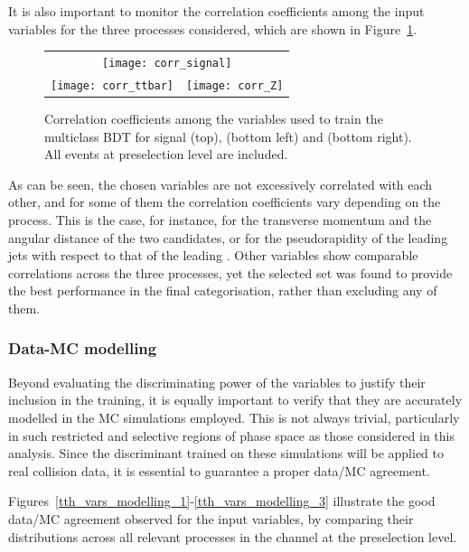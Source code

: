   It is also important to monitor the correlation coefficients among the input variables for the three processes considered, which are shown in Figure~\ref{tth_vars_corr}.
  \begin{figure}[htbp]
    \centering
    \setlength{\tabcolsep}{2pt}
    \renewcommand{\arraystretch}{0}
  
    \begin{tabular}{@{}c c@{}}
      \multicolumn{2}{c}{\texttt{[image: corr\_signal]}} \\[6pt]
      \texttt{[image: corr\_ttbar]} &
      \texttt{[image: corr\_Z]}
    \end{tabular}
  
    \caption{Correlation coefficients among the variables used to train the multiclass BDT for signal (top), \ttbar (bottom left) and \ztautau (bottom right). All events at preselection level are included.}
    \label{tth_vars_corr}
  \end{figure}
  
  As can be seen, the chosen variables are not excessively correlated with each other, and for some of them the correlation coefficients vary depending on the process. This is the case, for instance, for the transverse momentum and the angular distance of the two \tauhad candidates, or for the pseudorapidity of the leading jets with respect to that of the leading \tauhad. Other variables show comparable correlations across the three processes, yet the selected set was found to provide the best performance in the final categorisation, rather than excluding any of them.
  

\subsubsection*{Data-MC modelling}

Beyond evaluating the discriminating power of the variables to justify their inclusion in the training, it is equally important to verify that they are accurately modelled in the MC simulations employed. This is not always trivial, particularly in such restricted and selective regions of phase space as those considered in this analysis. Since the discriminant trained on these simulations will be applied to real collision data, it is essential to guarantee a proper data/MC agreement.  

Figures~\ref{tth_vars_modelling_1}-\ref{tth_vars_modelling_3} illustrate the good data/MC agreement observed for the input variables, by comparing their distributions across all relevant processes in the channel at the \ttH preselection level.

